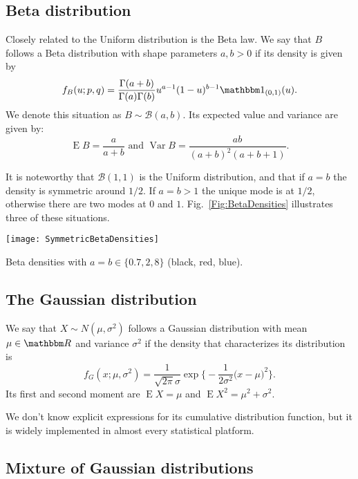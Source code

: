 \subsection{Beta distribution}\label{Sec:BetaDistribution}

Closely related to the Uniform distribution is the Beta law\cite{devro86}.
We say that $B$ follows a Beta distribution with shape parameters $a,b>0$ if its density is given by
\begin{equation}
f_B(u;p,q) = \frac{\Gamma(a+b)}{\Gamma(a)\Gamma(b)} u^{a-1} (1-u)^{b-1} \mathbbm 1_{(0,1)} (u).
\label{eq:BetaDensity}
\end{equation}
We denote this situation as $B\sim\mathcal B(a,b)$.
Its expected value and variance are given by:
$$
\operatorname{E}B = \frac{a}{a+b} \text{ and }
\operatorname{Var}B = \frac{ab}{(a+b)^2(a+b+1)}.
$$

It is noteworthy that $\mathcal B(1,1)$ is the Uniform distribution, and that if $a=b$ the density is symmetric around $1/2$.
If $a=b>1$ the unique mode is at $1/2$, otherwise there are two modes at $0$ and $1$.
Fig.~\ref{Fig:BetaDensities} illustrates three of these situations.

\begin{marginfigure}
	\centering
	\texttt{[image: SymmetricBetaDensities]}
	\caption{Beta densities with $a=b\in \{0.7,2,8 \}$ (black, red, blue).}
	\label{Fig:BetaDensities}
\end{marginfigure}

\subsection{The Gaussian distribution}

We say that $X\sim N(\mu,\sigma^2)$ follows a Gaussian distribution with mean $\mu\in\mathbbm R$ and variance $\sigma^2$ if the density that characterizes its distribution is
\begin{equation}
f_G(x;\mu,\sigma^2) = \frac{1}{\sqrt{2\pi}\sigma} \exp\Big\{
-\frac{1}{2\sigma^2} \big(x - \mu)^2
\Big\}.
\end{equation}
Its first and second moment are $\operatorname{E}X=\mu$ and
$\operatorname{E}X^2=\mu^2+\sigma^2$.

We don't know explicit expressions for its cumulative distribution function, but it is widely implemented in almost every statistical platform.

\subsection{Mixture of Gaussian distributions}

